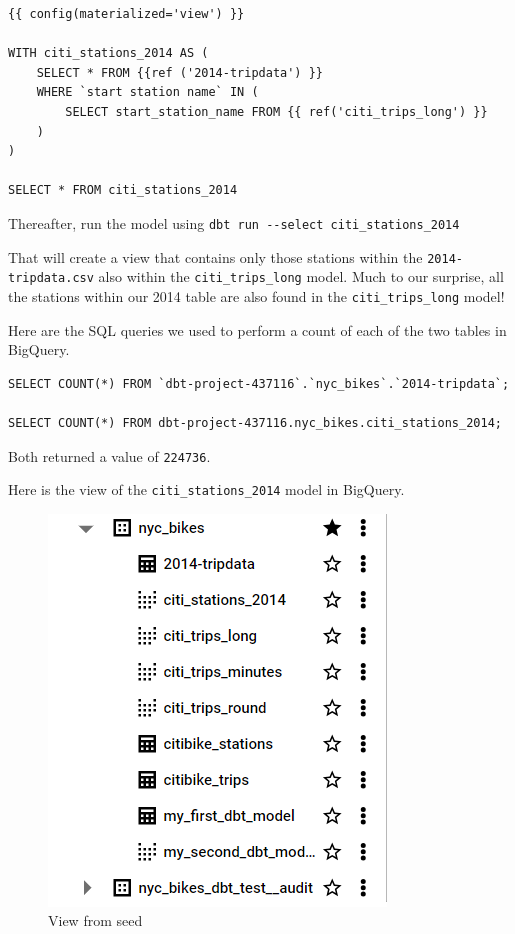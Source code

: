 \documentclass[
]{book}
\begin{document}
\begin{verbatim}
{{ config(materialized='view') }}

WITH citi_stations_2014 AS (
    SELECT * FROM {{ref ('2014-tripdata') }}
    WHERE `start station name` IN (
        SELECT start_station_name FROM {{ ref('citi_trips_long') }}
    )
)

SELECT * FROM citi_stations_2014
\end{verbatim}

Thereafter, run the model using \texttt{dbt\ run\ -\/-select\ citi\_stations\_2014}

That will create a view that contains only those stations within the \texttt{2014-tripdata.csv} also within the \texttt{citi\_trips\_long} model. Much to our surprise, all the stations within our 2014 table are also found in the \texttt{citi\_trips\_long} model!

Here are the SQL queries we used to perform a count of each of the two tables in BigQuery.

\begin{verbatim}
SELECT COUNT(*) FROM `dbt-project-437116`.`nyc_bikes`.`2014-tripdata`;

SELECT COUNT(*) FROM dbt-project-437116.nyc_bikes.citi_stations_2014;
\end{verbatim}

Both returned a value of \texttt{224736}.

Here is the view of the \texttt{citi\_stations\_2014} model in BigQuery.

\begin{figure}
\centering
\includegraphics{./images/seed_view.png}
\caption{View from seed}
\end{figure}
\end{document}
